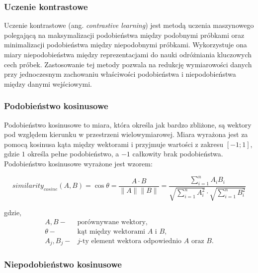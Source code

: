         \subsubsection{Uczenie kontrastowe}
            
            Uczenie kontrastowe (ang. \textit{contrastive learning}) \cite{Bromley:1993} jest metodą uczenia maszynowego polegającą na maksymalizacji podobieństwa między podobnymi próbkami oraz minimalizacji podobieństwa między niepodobnymi próbkami. Wykorzystuje ona miary niepodobieństwa między reprezentacjami do nauki odróżniania kluczowych cech próbek. Zastosowanie tej metody pozwala na redukcję wymiarowości danych przy jednoczesnym zachowaniu właściwości podobieństwa i niepodobieństwa między danymi wejściowymi.

        \subsubsection{Podobieństwo kosinusowe}

            Podobieństwo kosinusowe to miara, która określa jak bardzo zbliżone, są wektory pod względem kierunku w przestrzeni wielowymiarowej. Miara wyrażona jest za pomocą kosinusa kąta między wektorami i przyjmuje wartości z zakresu $[-1; 1]$, gdzie $1$ określa pełne podobieństwo, a $-1$ całkowity brak podobieństwa. Podobieństwo kosinusowe wyrażone jest wzorem:

            \begin{equation}
                similarity_{cosine}(A, B) = \cos{\theta} = \frac{A \cdot B}{\|A\| \|B\|} = \frac{
                    \sum^{n}_{i = 1}A_i B_i
                }{
                    \sqrt{
                        \sum^{n}_{i = 1}A_i^2
                    }
                    \cdot
                    \sqrt{
                        \sum^{n}_{i = 1}B_i^2
                    }
                }
            \end{equation}

            gdzie,
            \begin{align*}
                A, B -& \text{porównywane wektory,} \\
                \theta -& \text{kąt między wektorami $A$ i $B$,} \\
                A_j, B_j -& \text{$j$-ty element wektora odpowiednio $A$ oraz $B$.}
            \end{align*}

        \subsubsection{Niepodobieństwo kosinusowe}


